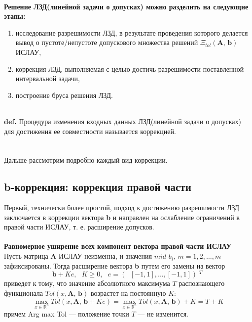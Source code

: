 \documentclass[a4paper,12pt]{article}
\begin{document}
\\
\textbf{Решение ЛЗД(линейной задачи о допусках) можно разделить на следующие этапы:}
\begin{enumerate}
    \item исследование разрешимости ЛЗД, в результате проведения которого делается вывод о пустоте/непустоте допускового множества решений $\Xi_{tol}(\textbf{A, b})$ ИСЛАУ,
    \item  коррекция ЛЗД, выполняемая с целью достичь разрешимости поставленной интервальной задачи,
    \item построение бруса решения ЛЗД.
\end{enumerate}
\\
\textbf{def.} Процедура изменения входных данных ЛЗД(линейной задачи о допусках) для достижения ее совместности называется коррекцией.\\
\\
\\Дальше рассмотрим подробно каждый вид коррекции.
\subsection{b-коррекция: коррекция правой части}
Первый, технически более простой, подход к достижению разрешимости ЛЗД заключается в коррекции вектора \textbf{b} и направлен на ослабление ограничений в правой части ИСЛАУ, т. е. расширение допусков.\\
\\
\textbf{Равномерное уширение всех компонент вектора правой части
ИСЛАУ}\\
Пусть матрица \textbf{A} ИСЛАУ неизменна, и значения $mid$ $b_i$, $m=1,2,\dots,m$ зафиксированы. Тогда расширение вектора \textbf{b} путем его замены на вектор
\begin{equation*}
\textbf{b} + Ke, \textbf{ }K ≥ 0,\textbf{ }e =(︀[−1, 1], . . . , [−1, 1])︀^T
 \end{equation*}
приведет к тому, что значение абсолютного максимума $T$ распознающего функционала $Tol(x,\textbf{A, b})$ возрастет на постоянную $K$:
\begin{equation*}
\max_{x \in \mathbb{R}^n}Tol(x, \textbf{A, b}+Ke)=\max_{x \in \mathbb{R}^n}Tol(x, \textbf{A, b})+K=T+K
\end{equation*}
причем Arg max Tol — положение точки $T$ — не изменится.
\\
\end{document}
